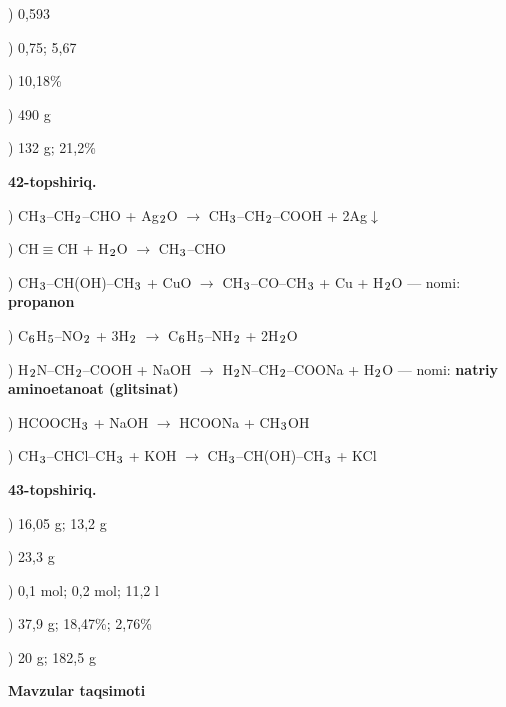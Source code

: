 \documentclass[11pt,a4paper]{article}
\renewcommand{\textsubscript}[1]{\ensuremath{_{\text{\fontsize{8}{8}\selectfont #1}}}}
\begin{document}
) 0,593\par
{}) 0,75; 5,67\par
{}) 10,18\%\par
{}) 490 g\par
{}) 132 g; 21,2\%\par
\noindent\textbf{42-topshiriq.}\par
{}) CH\textsubscript{3}--CH\textsubscript{2}--CHO + Ag\textsubscript{2}O $\to$ CH\textsubscript{3}--CH\textsubscript{2}--COOH + 2Ag$\downarrow$\par
{}) CH$\equiv$CH + H\textsubscript{2}O $\to$ CH\textsubscript{3}--CHO\par
{}) CH\textsubscript{3}--CH(OH)--CH\textsubscript{3} + CuO $\to$ CH\textsubscript{3}--CO--CH\textsubscript{3} + Cu + H\textsubscript{2}O --- nomi: \textbf{propanon}\par
{}) C\textsubscript{6}H\textsubscript{5}--NO\textsubscript{2} + 3H\textsubscript{2} $\to$ C\textsubscript{6}H\textsubscript{5}--NH\textsubscript{2} + 2H\textsubscript{2}O\par
{}) H\textsubscript{2}N--CH\textsubscript{2}--COOH + NaOH $\to$ H\textsubscript{2}N--CH\textsubscript{2}--COONa + H\textsubscript{2}O --- nomi: \textbf{natriy aminoetanoat (glitsinat)}\par
{}) HCOOCH\textsubscript{3} + NaOH $\to$ HCOONa + CH\textsubscript{3}OH\par
{}) CH\textsubscript{3}--CHCl--CH\textsubscript{3} + KOH $\to$ CH\textsubscript{3}--CH(OH)--CH\textsubscript{3} + KCl\par
\noindent\textbf{43-topshiriq.}\par
{}) 16,05 g; 13,2 g\par
{}) 23,3 g\par
{}) 0,1 mol; 0,2 mol; 11,2 l\par
{}) 37,9 g; 18,47\%; 2,76\%\par
{}) 20 g; 182,5 g\par
\par\bigskip\noindent\textbf{Mavzular taqsimoti}\par\smallskip
\end{document}
